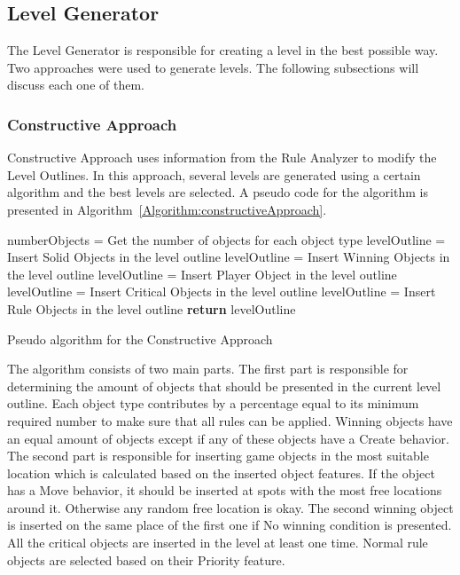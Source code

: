 \documentclass[letterpaper]{article}
\newcommand{\algref}[1]{Algorithm~\ref{Algorithm:#1}}
\begin{document}
\subsection{Level Generator}
The Level Generator is responsible for creating a level in the best possible way. Two approaches were used to generate levels. The following subsections will discuss each one of them.

\subsubsection{Constructive Approach}
Constructive Approach uses information from the Rule Analyzer to modify the Level Outlines. In this approach, several levels are generated using a certain algorithm and the best levels are selected. A pseudo code for the algorithm is presented in \algref{constructiveApproach}.\\\par

\setlength{\textfloatsep}{0pt}
\begin{algorithm}[ht]
	\BlankLine
	numberObjects = Get the number of objects for each object type\;
	\BlankLine
	levelOutline = Insert Solid Objects in the level outline\;
	levelOutline = Insert Winning Objects in the level outline\;
	levelOutline = Insert Player Object in the level outline\;
	levelOutline = Insert Critical Objects in the level outline\;
	levelOutline = Insert Rule Objects in the level outline\;
	\BlankLine
	\textbf{return} levelOutline\;
	\caption{Pseudo algorithm for the Constructive Approach}
	\label{Algorithm:constructiveApproach}
\end{algorithm}
\setlength{\textfloatsep}{10pt}

The algorithm consists of two main parts. The first part is responsible for determining the amount of objects that should be presented in the current level outline. Each object type contributes by a percentage equal to its minimum required number to make sure that all rules can be applied. Winning objects have an equal amount of objects except if any of these objects have a Create behavior. The second part is responsible for inserting game objects in the most suitable location which is calculated based on the inserted object features. If the object has a Move behavior, it should be inserted at spots with the most free locations around it. Otherwise any random free location is okay. The second winning object is inserted on the same place of the first one if No winning condition is presented. All the critical objects are inserted in the level at least one time. Normal rule objects are selected based on their Priority feature.
\end{document}
